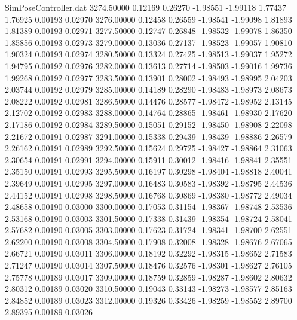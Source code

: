 \begin{filecontents}{SimPoseController.dat}
3274.50000    0.12169    0.26270    -1.98551   -1.99118    1.77437    1.76925    0.00193    0.02970
3276.00000    0.12458    0.26559    -1.98541   -1.99098    1.81893    1.81389    0.00193    0.02971
3277.50000    0.12747    0.26848    -1.98532   -1.99078    1.86350    1.85856    0.00193    0.02973
3279.00000    0.13036    0.27137    -1.98523   -1.99057    1.90810    1.90324    0.00193    0.02974
3280.50000    0.13324    0.27425    -1.98513   -1.99037    1.95272    1.94795    0.00192    0.02976
3282.00000    0.13613    0.27714    -1.98503   -1.99016    1.99736    1.99268    0.00192    0.02977
3283.50000    0.13901    0.28002    -1.98493   -1.98995    2.04203    2.03744    0.00192    0.02979
3285.00000    0.14189    0.28290    -1.98483   -1.98973    2.08673    2.08222    0.00192    0.02981
3286.50000    0.14476    0.28577    -1.98472   -1.98952    2.13145    2.12702    0.00192    0.02983
3288.00000    0.14764    0.28865    -1.98461   -1.98930    2.17620    2.17186    0.00192    0.02984
3289.50000    0.15051    0.29152    -1.98450   -1.98908    2.22098    2.21672    0.00191    0.02987
3291.00000    0.15338    0.29439    -1.98439   -1.98886    2.26579    2.26162    0.00191    0.02989
3292.50000    0.15624    0.29725    -1.98427   -1.98864    2.31063    2.30654    0.00191    0.02991
3294.00000    0.15911    0.30012    -1.98416   -1.98841    2.35551    2.35150    0.00191    0.02993
3295.50000    0.16197    0.30298    -1.98404   -1.98818    2.40041    2.39649    0.00191    0.02995
3297.00000    0.16483    0.30583    -1.98392   -1.98795    2.44536    2.44152    0.00191    0.02998
3298.50000    0.16768    0.30869    -1.98380   -1.98772    2.49034    2.48658    0.00190    0.03000
3300.00000    0.17053    0.31154    -1.98367   -1.98748    2.53536    2.53168    0.00190    0.03003
3301.50000    0.17338    0.31439    -1.98354   -1.98724    2.58041    2.57682    0.00190    0.03005
3303.00000    0.17623    0.31724    -1.98341   -1.98700    2.62551    2.62200    0.00190    0.03008
3304.50000    0.17908    0.32008    -1.98328   -1.98676    2.67065    2.66721    0.00190    0.03011
3306.00000    0.18192    0.32292    -1.98315   -1.98652    2.71583    2.71247    0.00190    0.03014
3307.50000    0.18476    0.32576    -1.98301   -1.98627    2.76105    2.75778    0.00189    0.03017
3309.00000    0.18759    0.32859    -1.98287   -1.98602    2.80632    2.80312    0.00189    0.03020
3310.50000    0.19043    0.33143    -1.98273   -1.98577    2.85163    2.84852    0.00189    0.03023
3312.00000    0.19326    0.33426    -1.98259   -1.98552    2.89700    2.89395    0.00189    0.03026

\end{filecontents}
